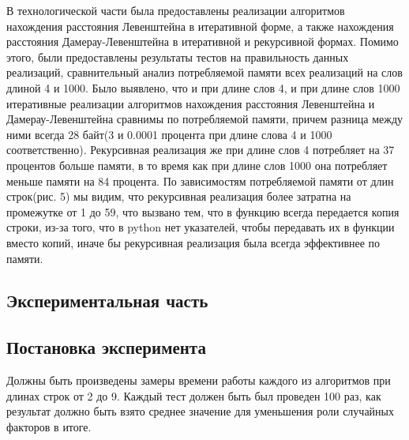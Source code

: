 \documentclass[a4paper, 14pt]{article}
\begin{document}
\begin{center}
\begin{flushleft}
	В технологической части была предоставлены реализации алгоритмов нахождения расстояния Левенштейна в итеративной форме, а также нахождения расстояния Дамерау-Левенштейна в итеративной и рекурсивной формах. Помимо этого, были предоставлены результаты тестов на правильность данных реализаций, сравнительный анализ потребляемой памяти всех реализаций на слов длиной 4 и 1000. Было выявлено, что и при длине слов 4, и при длине слов 1000 итеративные реализации алгоритмов нахождения расстояния Левенштейна и Дамерау-Левенштейна сравнимы по потребляемой памяти, причем разница между ними всегда 28 байт(3 и 0.0001 процента при длине слова 4 и 1000 соответственно). Рекурсивная реализация же при длине слов 4 потребляет на 37 процентов больше памяти, в то время как при длине слов 1000 она потребляет меньше памяти на 84 процента. По зависимостям потребляемой памяти от длин строк(рис. 5) мы видим, что рекурсивная реализация более затратна на промежутке от 1 до 59, что вызвано тем, что в функцию всегда передается копия строки, из-за того, что в python нет указателей, чтобы передавать их в функции вместо копий, иначе бы рекурсивная реализация была всегда эффективнее по памяти.	 

    \begin{center}
    	\newpage
        \section{Экспериментальная часть}
		\subsection{Постановка эксперимента}
		\begin{flushleft}
		\parindent=1cm
		Должны быть произведены замеры времени работы каждого из алгоритмов при длинах строк от 2 до 9. Каждый тест должен быть был проведен 100 раз, как результат должно быть взято среднее значение для уменьшения роли случайных факторов в итоге.\\
		\end{flushleft}		

\end{center}
\end{flushleft}
\end{center}
\end{document}
